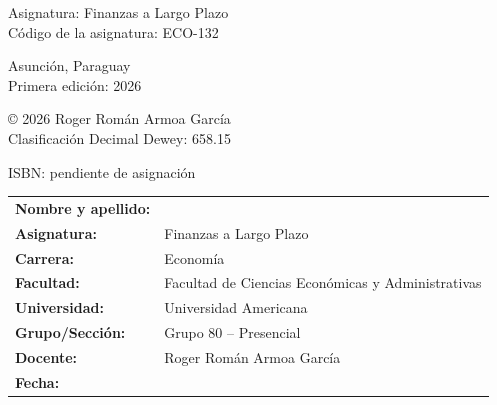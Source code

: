 \documentclass[10pt]{article}
\begin{document}
Asignatura: Finanzas a Largo Plazo\\
Código de la asignatura: ECO-132

Asunción, Paraguay\\
Primera edición: 2026

\bigskip

© 2026 Roger Román Armoa García
\\ Clasificación Decimal Dewey: 658.15
\vfill

\begin{center}
{\small ISBN: pendiente de asignación}
\vspace{0.3cm}
\end{center}

\clearpage
\tableofcontents
\cleardoublepage

\setcounter{page}{1}

\begin{tcolorbox}[
colback=gray!5,
colframe=black,
title=\textbf{Datos de identificación del trabajo},
sharp corners,
boxrule=0.8pt,
width=\textwidth
]

\renewcommand{\arraystretch}{1.8}

\begin{tabular}{p{} p{}}

\textbf{Nombre y apellido:} & \hrulefill \\

\textbf{Asignatura:} &
Finanzas a Largo Plazo \\

\textbf{Carrera:} &
Economía \\

\textbf{Facultad:} &
Facultad de Ciencias Económicas y Administrativas \\

\textbf{Universidad:} &
Universidad Americana \\

\textbf{Grupo/Sección:} &
Grupo 80 -- Presencial \\

\textbf{Docente:} &
Roger Román Armoa García \\

\textbf{Fecha:} &
\hrulefill \\

\end{tabular}

\end{tcolorbox}
\end{document}
